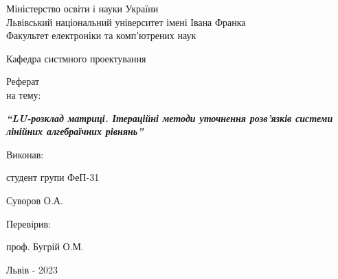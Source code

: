 \documentclass[12pt,a4paper]{article}
\begin{document}
\thispagestyle{empty}

 \begin{center}
 \large
 {Міністерство освіти і науки України}
 \\{Львівський національний університет імені Івана Франка}
 \\{Факультет електроніки та комп'ютрених наук}
 \end{center}

 \vspace{2cm}

 \begin{flushright}
 \large Кафедра систмного проектування
 \end{flushright}

 \vfill

 \begin{center}
 {\Huge{Реферат}}\\
 {\large{на тему}:}
 \end{center}

 \vspace{0.5cm}

 \begin{center}\Large
 \textbf{\emph{``LU-розклад матриці. Ітераційні методи уточнення розв'язків системи лінійних алгебраїчних рівнянь''}}
 \end{center}

 \vfill


 \begin{flushleft}
 \hskip10cm \large
 {Виконав:}
 \end{flushleft}

 \begin{flushleft}
 \hskip10cm \large
 {студент групи ФеП-31}
 \end{flushleft}

 \begin{flushleft}
 \hskip10cm \large
 {Суворов О.А.}
 \end{flushleft}

 \begin{flushleft}
 \hskip10cm \large
 {Перевірив}:
 \end{flushleft}

 \begin{flushleft}
 \hskip10cm \large
 {проф. Бугрій О.М.}
 \end{flushleft}

 \vfill

 \begin{center}
 \large
 {Львів - 2023}
 \end{center}
\end{document}

